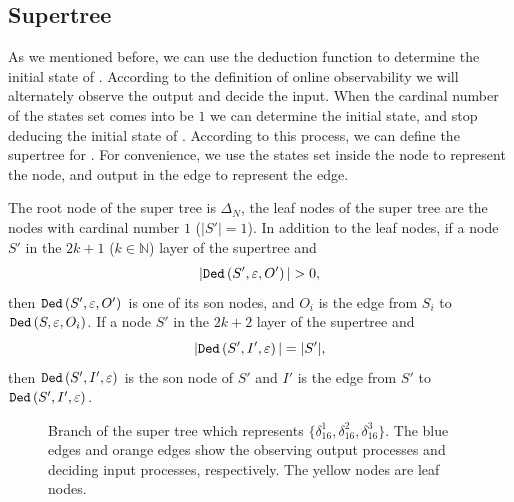 \subsection{Supertree} As we mentioned before, we can use the deduction function to determine the initial state of \BCNs. According to the definition of online observability we will alternately observe the output and decide the input. When the  cardinal number of the states set comes into be $1$ we can determine the initial state, and stop deducing the initial state of \BCNs. According to this process, we can define the supertree for \BCNs. For convenience, we use the states set inside the node to represent the node, and output in the edge to represent the edge.
\begin{definition}
The root node of the super tree is $\Delta_N$, the leaf nodes of the super tree are the nodes with cardinal number $1$ ($|S'|=1$). In addition to the leaf nodes, if a node $S'$ in the $2k + 1$ ($k\in \mathbb{N}$) layer of the supertree and 
\[|\Ded\left(S',\varepsilon, O'\right)|>0,\]
 then ${\tt Ded}\left(S',\varepsilon, O'\right)$ is one of its son nodes, and $O_i$ is the edge from $S_i$ to ${\tt Ded}\left(S,\varepsilon, O_i\right)$. If a node $S'$ in the $2k+2$ layer of the supertree and  
\[|{\tt Ded}\left(S',I',\varepsilon\right)|=|S'|,\] 
then ${\tt Ded}\left(S',I',\varepsilon\right)$ is the son node of $S'$ and $I'$ is the edge from $S'$ to ${\tt Ded}\left(S',I',\varepsilon\right)$. 
\end{definition}

  \begin{figure}[thpb]
      \centering
      
      \caption{Branch of the super tree which represents $\{\delta_{16}^1,\delta_{16}^2,\delta_{16}^3\}$. The blue edges and orange edges show the observing output processes and deciding input processes, respectively. The yellow nodes are leaf nodes.}
      \label{fig:3}
   \end{figure}

